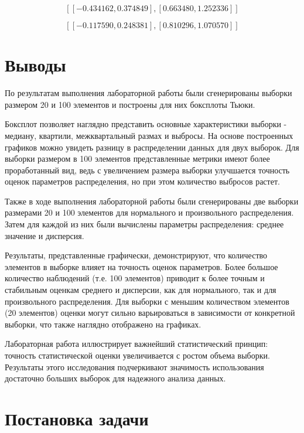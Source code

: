 \documentclass[12pt,a4paper]{article}
\begin{document}
	\vspace{12em}

	\[
		[[-0.434162, 0.374849], [0.663480, 1.252336]]
	\]

	\[
		[[-0.117590, 0.248381], [0.810296, 1.070570]]
	\]

	\vspace{10em}

	\section{Выводы}

	По результатам выполнения лабораторной работы были сгенерированы выборки
	размером 20 и 100 элементов и построены для них боксплоты Тьюки.

	Боксплот позволяет наглядно представить основные характеристики выборки
	- медиану, квартили, межквартальный размах и выбросы. На основе
	построенных графиков можно увидеть разницу в распределении данных для
	двух выборок. Для выборки размером в 100 элементов представленные
	метрики имеют более проработанный вид, ведь с увеличением размера
	выборки улучшается точность оценок параметров распределения, но при этом
	количество выбросов растет.

	Также в ходе выполнения лабораторной работы были сгенерированы две
	выборки размерами 20 и 100 элементов для нормального и произвольного
	распределения. Затем для каждой из них были вычислены параметры
	распределения: среднее значение и дисперсия.

	Результаты, представленные графически, демонстрируют, что количество
	элементов в выборке влияет на точность оценок параметров. Более большое
	количество наблюдений (т.е. 100 элементов) приводит к более точным и
	стабильным оценкам среднего и дисперсии, как для нормального, так и для
	произвольного распределения. Для выборки с меньшим количеством элементов
	(20 элементов) оценки могут сильно варьироваться в зависимости от
	конкретной выборки, что также наглядно отображено на графиках.

	Лабораторная работа иллюстрирует важнейший статистический принцип:
	точность статистической оценки увеличивается с ростом объема выборки.
	Результаты этого исследования подчеркивают значимость использования
	достаточно больших выборок для надежного анализа данных.

	\section{Постановка задачи}
\end{document}
